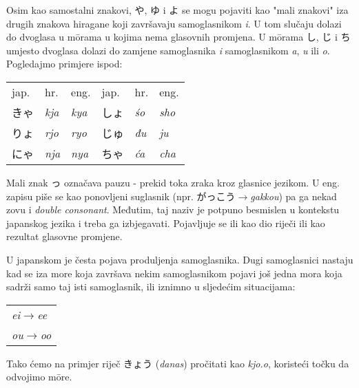 	
	Osim kao samostalni znakovi, や, ゆ i よ se mogu pojaviti kao "mali znakovi" iza drugih znakova hiragane koji završavaju samoglasnikom \textit{i}. U tom slučaju dolazi do dvoglasa\footnotemark[2] u m\={o}rama u kojima nema glasovnih promjena. U m\={o}rama し, じ i ち umjesto dvoglasa dolazi do zamjene samoglasnika \textit{i} samoglasnikom \textit{a}, \textit{u} ili \textit{o}. Pogledajmo primjere ispod:
	
	\begin{tabular}{l l l | l l l}
		jap.&hr.&eng.&jap.&hr.&eng.\\
		きゃ&\textit{kja}&\textit{kya}&しょ&\textit{\'{s}o}&\textit{sho}\\
		りょ&\textit{rjo}&\textit{ryo}&じゅ&\textit{đu}&\textit{ju}\\
		にゃ&\textit{nja}&\textit{nya}&ちゃ&\textit{ća}&\textit{cha}\\
	\end{tabular}

	
	Mali znak っ označava pauzu - prekid toka zraka kroz glasnice jezikom. U eng. zapisu piše se kao ponovljeni suglasnik (npr. がっこう$\rightarrow$\textit{gakkou}) pa ga nekad zovu i \textit{double consonant}. Međutim, taj naziv je potpuno besmislen u kontekstu japanskog jezika i treba ga izbjegavati. Pojavljuje se ili kao dio riječi ili kao rezultat glasovne promjene.
	
	
	U japanskom je česta pojava produljenja samoglasnika. Dugi samoglasnici nastaju kad se iza more koja završava nekim samoglasnikom pojavi još jedna mora koja sadrži samo taj isti samoglasnik, ili iznimno u sljedećim situacijama:
	
	\vspace{5pt}
	\begin{tabular}{l}
		\textit{ei}$\rightarrow$\textit{ee}\\
		\textit{ou}$\rightarrow$\textit{oo}\\
	\end{tabular}

	\vspace{5pt}
	Tako ćemo na primjer riječ きょう (\textit{danas}) pročitati kao \textit{kjo.o}, koristeći točku da odvojimo m\={o}re.
	
